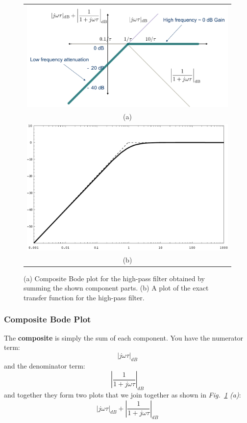 \begin{figure}[t]
\centering
\begin{tabular}{c}
\includegraphics[width=.75\columnwidth]{mod1_3_11_bode3}\\
(a)\\
\includegraphics[angle=-0.0,width=.75\columnwidth]{mag_hpf}\\
(b)\\
\end{tabular}
\caption{(a) Composite Bode plot for the high-pass filter obtained by summing the shown component parts.  (b) A plot of the exact transfer function for the high-pass filter.}
\label{fig:bode}
\end{figure}
\subsubsection{Composite Bode Plot}
The \textbf{composite} is simply the sum of each component.  You have the numerator term:
    \begin{equation}
        {\left| {j\omega \tau } \right|_{dB}}
    \end{equation}
and the denominator term:
    \begin{equation}
        {\left| {\frac{1}{{1 + j\omega \tau }}} \right|_{dB}}
    \end{equation}
and together they form two plots that we join together as shown in \emph{Fig.~\ref{fig:bode} (a)}:
    \begin{equation}
        {\left| {j\omega \tau } \right|_{dB}} + {\left| {\frac{1}{{1 + j\omega \tau }}} \right|_{dB}}
    \end{equation}

